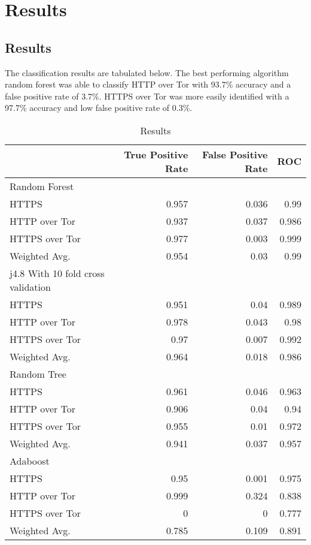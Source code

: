 \chapter{Results}

\section{Results}

The classification results are tabulated below. The best performing algorithm
random forest was able to classify HTTP over Tor with 93.7\% accuracy and a
false positive rate of 3.7\%. HTTPS over Tor was more easily identified with a
97.7\% accuracy and low false positive rate of 0.3\%.

\begin{table}[H]
  \begin{tabular}{lrrr}
    \toprule
    & True Positive Rate & False Positive Rate & ROC \\
    \midrule
    Random Forest\\
    \midrule
    HTTPS & 0.957 & 0.036 & 0.99\\
    HTTP over Tor & 0.937 & 0.037 & 0.986\\
    HTTPS over Tor & 0.977 & 0.003 & 0.999\\
    Weighted Avg. & 0.954 & 0.03 & 0.99\\
    \midrule
    j4.8 With 10 fold cross validation\\
    \midrule
    HTTPS & 0.951 & 0.04 & 0.989\\
    HTTP over Tor & 0.978 & 0.043 & 0.98\\
    HTTPS over Tor & 0.97 & 0.007 & 0.992\\
    Weighted Avg. & 0.964 & 0.018 & 0.986\\
    \midrule
    Random Tree\\
    \midrule
    HTTPS & 0.961 & 0.046 & 0.963\\
    HTTP over Tor & 0.906 & 0.04 & 0.94\\
    HTTPS over Tor & 0.955 & 0.01 & 0.972\\
    Weighted Avg. & 0.941 & 0.037 & 0.957\\
    \midrule
    Adaboost\\
    \midrule
    HTTPS & 0.95 & 0.001 & 0.975\\
    HTTP over Tor & 0.999 & 0.324 & 0.838\\
    HTTPS over Tor & 0 & 0 & 0.777\\
    Weighted Avg. & 0.785 & 0.109 & 0.891\\
    \bottomrule
  \end{tabular}
  \caption{Results}
  \label{table:results}
\end{table}

